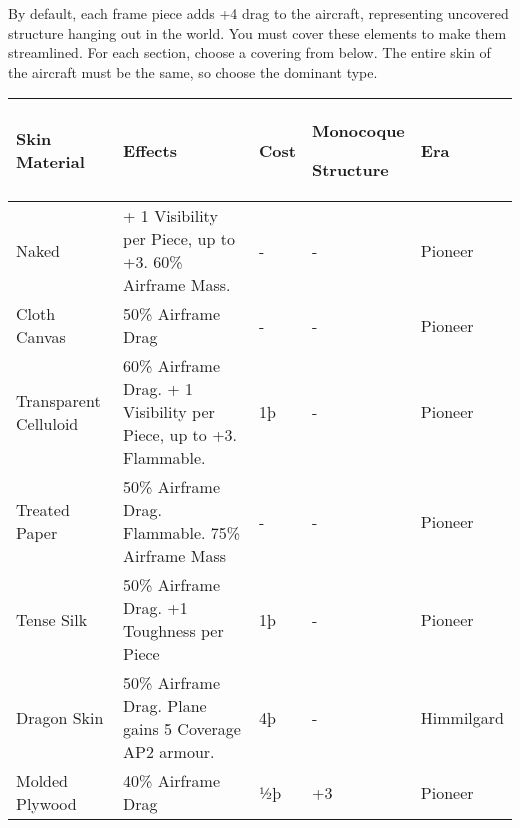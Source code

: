 \documentclass{article}
\begin{document}
By default, each frame piece adds +4 drag to the aircraft,
representing uncovered structure hanging out in the world. You must
cover these elements to make them streamlined. For each section, choose
a covering from below. The entire skin of the aircraft must be the same,
so choose the dominant type.

\begin{tabular}{|l|l|l|l|l|}
    \hline
    Skin Material                & Effects                                                 & Cost       & Monocoque

    Structure                    & Era                                                                                          \\\hline
    Naked                        & + 1 Visibility per Piece, up to +3. 60\% Airframe Mass. & -          & -
                                 & Pioneer                                                                                      \\\hline
    Cloth Canvas                 & 50\% Airframe Drag                                      & -          & -           & Pioneer \\\hline
    Transparent Celluloid        & {60\% Airframe Drag. + 1 Visibility per
    Piece, up to +3. Flammable.} & {1þ}                                                    & {-}        &
    {Pioneer}                                                                                                                   \\\hline
    Treated Paper                & 50\% Airframe Drag. Flammable. 75\% Airframe Mass       & -          &
    -                            & Pioneer                                                                                      \\\hline
    Tense Silk                   & 50\% Airframe Drag. +1 Toughness per Piece              & 1þ         & -           &
    Pioneer                                                                                                                     \\\hline
    Dragon Skin                  & 50\% Airframe Drag. Plane gains 5 Coverage AP2 armour.  &
    4þ                           & -                                                       & Himmilgard                         \\\hline
    Molded Plywood               & 40\% Airframe Drag                                      & ½þ         & +3          & Pioneer \\\hline

\end{tabular}
\end{document}
